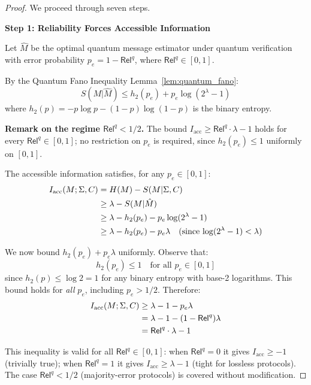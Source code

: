 \documentclass{ieeeaccess}
\newcommand{\Rel}{\mathsf{Rel}}
\begin{document}
\begin{proof}
We proceed through seven steps.

\textbf{Step 1: Reliability Forces Accessible Information}

Let $\hat{M}$ be the optimal quantum message estimator under 
quantum verification with error probability $p_e = 1 - \Rel^q$, 
where $\Rel^q \in [0,1]$.

By the Quantum Fano Inequality Lemma~\ref{lem:quantum_fano}:
\begin{equation}
    S(M|\hat{M}) \leq h_2(p_e) + p_e \log(2^\lambda - 1)
\end{equation}
where $h_2(p) = -p\log p - (1-p)\log(1-p)$ is the binary entropy.

\textbf{Remark on the regime $\Rel^q < 1/2$.}
The bound $I_{\mathrm{acc}} \geq \Rel^q \cdot \lambda - 1$ holds for every $\Rel^q \in [0,1]$; no restriction on $p_e$ is required, since $h_2(p_e) \leq 1$ uniformly on $[0,1]$.

The accessible information satisfies, for any $p_e \in [0,1]$:
\begin{align}
    I_{\mathrm{acc}}(M; \Sigma, C) 
    &= H(M) - S(M|\Sigma, C) \notag\\
    &\geq \lambda - S(M|\hat{M}) \notag\\
    &\geq \lambda - h_2(p_e) - p_e \log(2^\lambda - 1) \notag\\
    &\geq \lambda - h_2(p_e) - p_e \lambda
        \quad \text{(since $\log(2^\lambda - 1) < \lambda$)}
\end{align}

We now bound $h_2(p_e) + p_e \lambda$ uniformly. Observe that:
\begin{equation}
    h_2(p_e) \leq 1 \quad \text{for all } p_e \in [0,1]
\end{equation}
since $h_2(p) \leq \log 2 = 1$ for any binary entropy with base-2 
logarithms. This bound holds for \emph{all} $p_e$, including 
$p_e > 1/2$. Therefore:
\begin{align}
    I_{\mathrm{acc}}(M; \Sigma, C) 
    &\geq \lambda - 1 - p_e \lambda \notag\\
    &= \lambda - 1 - (1 - \Rel^q)\lambda \notag\\
    &= \Rel^q \cdot \lambda - 1
\end{align}

This inequality is valid for all $\Rel^q \in [0,1]$: when 
$\Rel^q = 0$ it gives $I_{\mathrm{acc}} \geq -1$ (trivially true); 
when $\Rel^q = 1$ it gives $I_{\mathrm{acc}} \geq \lambda - 1$ 
(tight for lossless protocols). The case $\Rel^q < 1/2$ 
(majority-error protocols) is covered without modification.


\end{proof}
\end{document}
